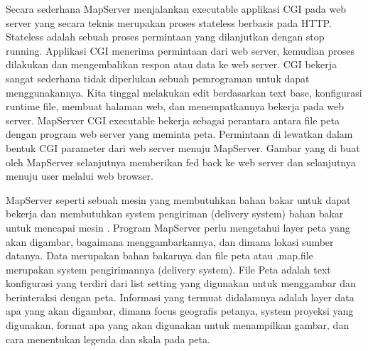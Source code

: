 Secara sederhana MapServer menjalankan executable applikasi CGI pada web server yang secara teknis merupakan 
proses stateless berbasis pada HTTP. Stateless adalah sebuah proses permintaan yang dilanjutkan dengan stop running. 
Applikasi CGI menerima permintaan dari web server, kemudian proses dilakukan dan mengembalikan respon atau data ke web server.
CGI bekerja sangat sederhana tidak diperlukan sebuah pemrograman untuk dapat menggunakannya. 
Kita tinggal melakukan edit berdasarkan text base, konfigurasi runtime file, membuat halaman web, 
dan menempatkannya bekerja pada web server. MapServer CGI executable bekerja sebagai perantara antara file peta 
dengan program web server yang meminta peta. Permintaan di lewatkan dalam bentuk CGI parameter dari web server menuju MapServer.
Gambar yang di buat oleh MapServer selanjutnya memberikan fed back ke web server dan selanjutnya menuju 
user melalui web browser.

MapServer seperti sebuah mesin yang membutuhkan bahan bakar untuk dapat bekerja dan membutuhkan system pengiriman (delivery system) bahan bakar untuk mencapai mesin . Program MapServer perlu mengetahui layer peta yang akan digambar, bagaimana menggambarkannya, dan dimana lokasi sumber datanya. Data merupakan bahan bakarnya dan file peta atau .map.file merupakan system pengirimannya (delivery system). File Peta adalah text konfigurasi yang terdiri dari list setting yang digunakan untuk menggambar dan berinteraksi dengan peta. Informasi yang termuat didalamnya adalah layer data apa yang akan digambar, dimana focus geografis petanya, system proyeksi yang digunakan, format apa yang akan digunakan untuk menampilkan gambar, dan cara menentukan legenda dan skala pada peta.
